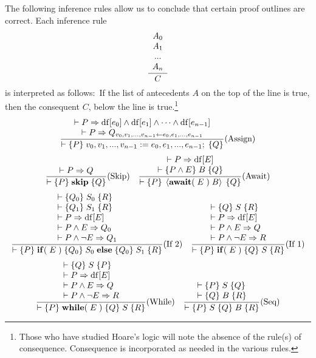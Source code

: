 \documentclass[11pt]{article}%
\begin{document}
The following inference rules allow us to conclude that certain proof outlines
are correct. Each inference rule%
\[
\frac{%
\begin{array}
[c]{c}%
A_{0}\\
A_{1}\\
...\\
A_{n}%
\end{array}
}{C}%
\]
is interpreted as follows:\ If the list of antecedents $A$ on the top of the
line is true, then the consequent $C$, below the line is true.\footnote{Those
who have studied Hoare's logic will note the absence of the rule(s) of
consequence. Consequence is incorporated as needed in the various rules.}%
\[
\frac{%
\begin{array}
[c]{c}%
\vdash P\Rightarrow\mathrm{df}[e_{0}]\wedge\mathrm{df}[e_{1}]\wedge
\cdots\wedge\mathrm{df}[e_{n-1}]\\
\vdash P\Rightarrow Q_{v_{0},v_{1},...,v_{n-1}\leftarrow e_{0},e_{1}%
,...,e_{n-1}}%
\end{array}
}{\vdash\{P\}\;v_{0},v_{1},...,v_{n-1}:=e_{0},e_{1},...,e_{n-1};\;\{Q\}}%
\text{(Assign)}%
\]%
\[
\frac{\vdash P\Rightarrow Q}{\vdash\{P\}\;\mathbf{skip}\;\{Q\}}%
\text{(Skip)\quad}\frac{%
\begin{array}
[c]{c}%
\vdash P\Rightarrow\mathrm{df}[E]\\
\vdash\{P\wedge E\}\;B\;\{Q\}
\end{array}
}{\vdash\{P\}\;\left\langle \mathbf{await}(\;E\;)\;B\right\rangle
\;\{Q\}}\text{(Await)}%
\]%
\[
\frac{%
\begin{array}
[c]{l}%
\vdash\{Q_{0}\}\;S_{0}\;\{R\}\\
\vdash\{Q_{1}\}\;S_{1}\;\{R\}\\
\vdash P\Rightarrow\mathrm{df}[E]\\
\vdash P\wedge E\Rightarrow Q_{0}\\
\vdash P\wedge\lnot E\Rightarrow Q_{1}%
\end{array}
}{\vdash\{P\}\;\mathbf{if}(\;E\;)\;\{Q_{0}\}\;S_{0}\;\mathbf{else}%
\;\{Q_{0}\}\;S_{1}\;\{R\}}\text{(If 2)\quad}\frac{%
\begin{array}
[c]{l}%
\vdash\{Q\}\;S\;\{R\}\\
\vdash P\Rightarrow\mathrm{df}[E]\\
\vdash P\wedge E\Rightarrow Q\\
\vdash P\wedge\lnot E\Rightarrow R
\end{array}
}{\vdash\{P\}\;\mathbf{if}(\;E\;)\;\{Q\}\;S\;\{R\}}\text{(If 1)}%
\]%
\[
\frac{%
\begin{array}
[c]{l}%
\vdash\{Q\}\;S\;\{P\}\\
\vdash P\Rightarrow\mathrm{df}[E]\\
\vdash P\wedge E\Rightarrow Q\\
\vdash P\wedge\lnot E\Rightarrow R
\end{array}
}{\vdash\{P\}\;\mathbf{while}(\;E\;)\;\{Q\}\;S\;\{R\}}\text{(While)\quad}%
\frac{%
\begin{array}
[c]{l}%
\vdash\{P\}\;S\;\{Q\}\\
\vdash\{Q\}\;B\;\{R\}
\end{array}
}{\vdash\{P\}\;S\;\{Q\}\;B\;\{R\}}\text{(Seq)}%
\]%
\end{document}
